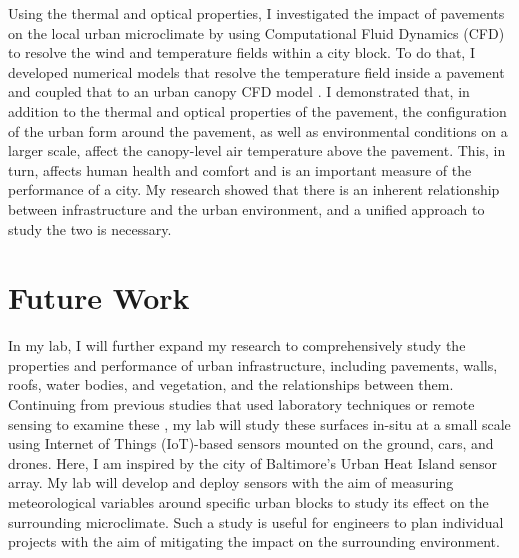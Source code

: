 \documentclass[12pt]{article}
\begin{document}
Using the thermal and optical properties, I investigated the impact of pavements on the local urban microclimate by using Computational Fluid Dynamics (CFD) to resolve the wind and temperature fields within a city block. To do that, I developed numerical models that resolve the temperature field inside a pavement \cite{sen2017microscale} and coupled that to an urban canopy CFD model \cite{sen2017uncoupled}. I demonstrated that, in addition to the thermal and optical properties of the pavement, the configuration of the urban form around the pavement, as well as environmental conditions on a larger scale, affect the canopy-level air temperature above the pavement. This, in turn, affects human health and comfort and is an important measure of the performance of a city. My research showed that there is an inherent relationship between infrastructure and the urban environment, and a unified approach to study the two is necessary.

\section*{Future Work}
In my lab, I will further expand my research to comprehensively study the properties and performance of urban infrastructure, including pavements, walls, roofs, water bodies, and vegetation, and the relationships between them. Continuing from previous studies that used laboratory techniques or remote sensing to examine these \cite{berdahl1997preliminary, niachou2001analysis, sun2012can, gallo1993use}, my lab will study these surfaces in-situ at a small scale using Internet of Things (IoT)-based sensors mounted on the ground, cars, and drones. Here, I am inspired by the city of Baltimore's Urban Heat Island sensor array. My lab will develop and deploy sensors with the aim of measuring meteorological variables around specific urban blocks to study its effect on the surrounding microclimate. Such a study is useful for engineers to plan individual projects with the aim of mitigating the impact on the surrounding environment. 
\end{document}

